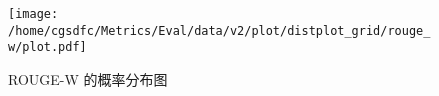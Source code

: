 \begin{figure}[H]%
\centering%
\texttt{[image: /home/cgsdfc/Metrics/Eval/data/v2/plot/distplot\_grid/rouge\_w/plot.pdf]}%
\caption{ROUGE{-}W 的概率分布图}%
\label{fig:ROUGE{-}Wdist}%
\end{figure}